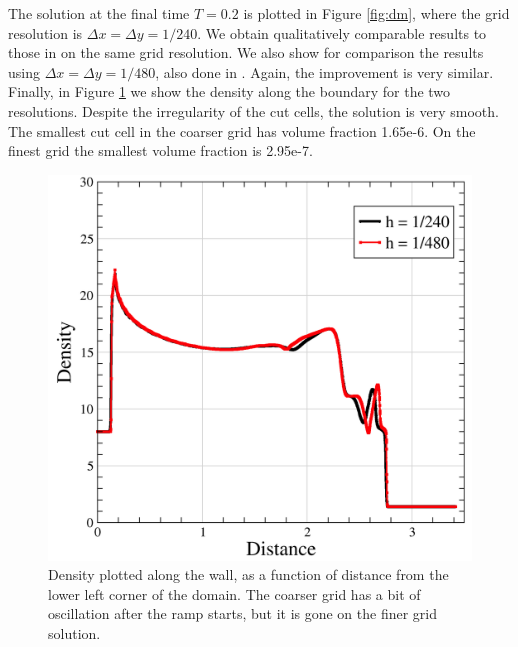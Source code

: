 The solution at the final time $T = 0.2$ is plotted in Figure \ref{fig:dm}, 
where the grid resolution is $\Delta x = \Delta y = 1/240$.
We obtain qualitatively comparable results to those in \cite{rkdg5} on 
the same grid resolution. We also show for comparison the results using 
$\Delta x = \Delta y = 1/480$, also done in \cite{rkdg5}. Again, the
improvement is very similar. Finally, in Figure \ref{fig:wedgeBndry} we
show the density along the boundary for the two resolutions. Despite the
irregularity of the cut cells, the solution is very smooth. The smallest
cut cell in the coarser grid has volume fraction 1.65e-6. On the finest
grid the smallest volume fraction is 2.95e-7. 

\begin{figure}[h]
\centering
\includegraphics[width=.7\linewidth]{figs/rampWall.png}
\caption{\sf Density plotted along the wall, as a function of distance from
the lower left corner of the domain. The coarser grid has a bit of
oscillation after the ramp starts, but it is gone on the finer grid
solution.} \label{fig:wedgeBndry}
\end{figure}



